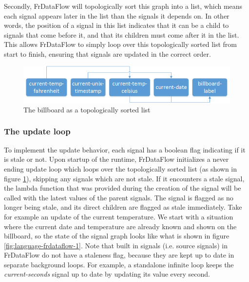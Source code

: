 Secondly, FrDataFlow will topologically sort this graph into a list, which means each signal appears later in the list than the signals it depends on. In other words, the position of a signal in this list indicates that it can be a child to signals that come before it, and that its children must come after it in the list. This allows FrDataFlow to simply loop over this topologically sorted list from start to finish, ensuring that signals are updated in the correct order. 

\begin{figure}[h]
	\centerline{\includegraphics[width=\textwidth]{images/Language-FrDataflow-TopologicallySortedList.png}}
	\caption{The billboard as a topologically sorted list}
	\label{fig:language-frdataflow-topologically-sorted-list}
\end{figure}

\subsubsection{The update loop}

To implement the update behavior, each signal has a boolean flag indicating if it is stale or not. 
Upon startup of the runtime, FrDataFlow initializes a never ending update loop which loops over the topologically sorted list (as shown in figure \ref{fig:language-frdataflow-topologically-sorted-list}), skipping any signals which are not stale. 
If it encounters a stale signal, the lambda function that was provided during the creation of the signal will be called with the latest values of the parent signals. The signal is flagged as no longer being stale, and its direct children are flagged as stale immediately. Take for example an update of the current temperature. We start with a situation where the current date and temperature are already known and shown on the billboard, so the state of the signal graph looks like what is shown in figure \ref{fig:language-frdataflow-1}. 
Note that built in signals (i.e. source signals) in FrDataFlow do not have a staleness flag, because they are kept up to date in separate background loops. For example, a standalone infinite loop keeps the \textit{current-seconds} signal up to date by updating its value every second. 

